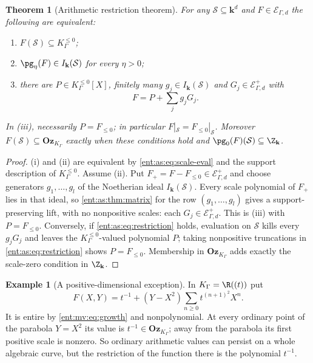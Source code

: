 \documentclass[11pt]{article}
\newtheorem{theorem}{Theorem}[section]
\theoremstyle{plain}
\theoremstyle{plain}
\theoremstyle{plain}
\theoremstyle{definition}
\theoremstyle{definition}
\theoremstyle{definition}
\newtheorem{example}[example]{Example}
\theoremstyle{definition}
\theoremstyle{remark}
\newcommand{\K}{K_\Gamma}\newcommand{\KD}{K_\Delta}
\newcommand{\kk}{\mathbf k}\newcommand{\PP}{\mathbb P}
\newcommand{\Oz}{\mathbf{Oz}}\newcommand{\Ed}{\mathcal E_{\Gamma,d}}
\newcommand{\Kle}{K_\Gamma^{\le0}}\DeclareMathOperator{\Jac}{Jac}
\newcommand{\Zk}{\Z_{\kk}}\newcommand{\OzK}{\Oz_{\K}}
\begin{document}
\begin{theorem}[Arithmetic restriction theorem]\label{ent:as:thm:restriction}
For any $\mathcal S\subseteq\kk^d$ and $F\in\Ed$ the following are
equivalent:
\begin{enumerate}[label=\textnormal{(\roman*)},leftmargin=2em]
\item $F(\mathcal S)\subseteq\Kle$;
\item $\pg_\eta(F)\in I_\kk(\mathcal S)$ for every $\eta>0$;
\item there are $P\in\Kle[X]$, finitely many $g_j\in I_\kk(\mathcal S)$ and
$G_j\in\Ed^{+}$ with
\begin{equation}\label{ent:as:eq:restriction}
 F=P+\sum_jg_jG_j .
\end{equation}
\end{enumerate}
In (iii), necessarily $P=F_{\le0}$; in particular
$F|_{\mathcal S}=F_{\le0}|_{\mathcal S}$. Moreover $F(\mathcal S)\subseteq\OzK$
exactly when these conditions hold and $\pg_0(F)(\mathcal S)\subseteq\Zk$.
\end{theorem}
\begin{proof}
(i) and (ii) are equivalent by \eqref{ent:as:eq:scale-eval} and the support
description of $\Kle$. Assume (ii). Put $F_+=F-F_{\le0}\in\Ed^{+}$ and choose
generators $g_1,\ldots,g_l$ of the Noetherian ideal $I_\kk(\mathcal S)$. Every
scale polynomial of $F_+$ lies in that ideal, so \cref{ent:as:thm:matrix} for
the row $(g_1,\ldots,g_l)$ gives a support-preserving lift, with no
nonpositive scales: each $G_j\in\Ed^{+}$. This is (iii) with $P=F_{\le0}$.
Conversely, if \eqref{ent:as:eq:restriction} holds, evaluation on $\mathcal S$
kills every $g_jG_j$ and leaves the $\Kle$-valued polynomial $P$; taking
nonpositive truncations in \eqref{ent:as:eq:restriction} shows $P=F_{\le0}$.
Membership in $\OzK$ adds exactly the scale-zero condition in $\Zk$.
\end{proof}

\begin{example}[A positive-dimensional exception]\label{ent:as:ex:parabola}
In $\K=\R((t))$ put
\[
 F(X,Y)=t^{-1}+(Y-X^2)\sum_{n\ge0}t^{(n+1)^2}X^n .
\]
It is entire by \eqref{ent:mv:eq:growth} and nonpolynomial. At every ordinary
point of the parabola $Y=X^2$ its value is $t^{-1}\in\OzK$; away from the
parabola its first positive scale is nonzero. So ordinary arithmetic values
can persist on a whole algebraic curve, but the restriction of the function
there is the polynomial $t^{-1}$.
\end{example}
\end{document}
